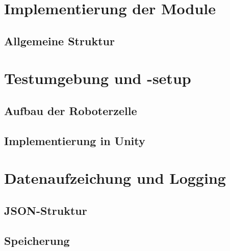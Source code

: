 \section{Implementierung der Module}

\subsection{Allgemeine Struktur}







\section{Testumgebung und -setup}
\subsection{Aufbau der Roboterzelle}
\subsection{Implementierung in Unity}
\section{Datenaufzeichung und Logging}
\subsection{JSON-Struktur}
\subsection{Speicherung}
